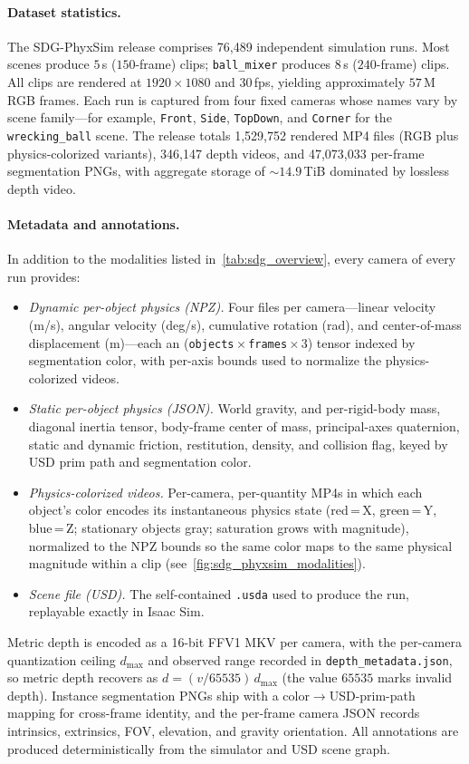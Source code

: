 \paragraph{Dataset statistics.}
\label{appendix:sdg_phyxsim_dataset_statistics}
The SDG-PhyxSim release comprises 76{,}489 independent simulation
runs. Most scenes produce $5$\,s ($150$-frame) clips; \texttt{ball\_mixer}
produces $8$\,s ($240$-frame) clips. All clips are rendered at
$1920{\times}1080$ and $30$\,fps, yielding approximately $57$\,M RGB frames.
Each run is captured from four fixed cameras whose names vary by scene
family---for example, \texttt{Front}, \texttt{Side}, \texttt{TopDown},
and \texttt{Corner} for the \texttt{wrecking\_ball} scene. The release totals 1{,}529{,}752 rendered MP4 files (RGB plus
physics-colorized variants), 346{,}147 depth videos, and
47{,}073{,}033 per-frame segmentation PNGs, with aggregate storage of
${\sim}14.9$\,TiB dominated by lossless depth video.

\paragraph{Metadata and annotations.}
\label{appendix:sdg_phyxsim_metadata_annotations}
In addition to the modalities listed in~\cref{tab:sdg_overview}, every camera of every run provides:
\begin{itemize}
    \item \textit{Dynamic per-object physics (NPZ).} Four files per camera---linear velocity (m/s), angular velocity (deg/s), cumulative rotation (rad), and center-of-mass displacement (m)---each an (\texttt{objects}\,$\times$\,\texttt{frames}\,$\times$\,$3$) tensor indexed by segmentation color, with per-axis bounds used to normalize the physics-colorized videos.
    \item \textit{Static per-object physics (JSON).} World gravity, and per-rigid-body mass, diagonal inertia tensor, body-frame center of mass, principal-axes quaternion, static and dynamic friction, restitution, density, and collision flag, keyed by USD prim path and segmentation color.
    \item \textit{Physics-colorized videos.} Per-camera, per-quantity MP4s in which each object's color encodes its instantaneous physics state (red\,=\,X, green\,=\,Y, blue\,=\,Z; stationary objects gray; saturation grows with magnitude), normalized to the NPZ bounds so the same color maps to the same physical magnitude within a clip (see~\cref{fig:sdg_phyxsim_modalities}).
    \item \textit{Scene file (USD).} The self-contained \texttt{.usda} used to produce the run, replayable exactly in Isaac Sim.
\end{itemize}
Metric depth is encoded as a 16-bit FFV1 MKV per camera, with the per-camera quantization ceiling $d_{\max}$ and observed range recorded in \texttt{depth\_metadata.json}, so metric depth recovers as $d = (v/65535)\,d_{\max}$ (the value $65535$ marks invalid depth). Instance segmentation PNGs ship with a color$\rightarrow$USD-prim-path mapping for cross-frame identity, and the per-frame camera JSON records intrinsics, extrinsics, FOV, elevation, and gravity orientation. All annotations are produced deterministically from the simulator and USD scene graph.

